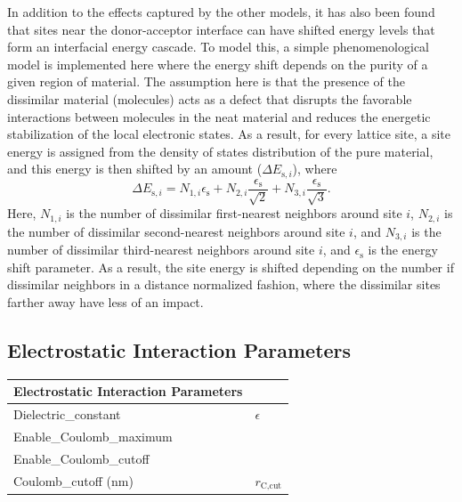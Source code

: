 \documentclass[%
 reprint,onecolumn,notitlepage,
superscriptaddress,longbibliography,
 amsmath,amssymb,
 aps,rmp,floatfix,
]{revtex4-1}
\begin{document}
In addition to the effects captured by the other models, it has also been found that sites near the donor-acceptor interface can have shifted energy levels that form an interfacial energy cascade.\cite{jamieson2012cs} 
To model this, a simple phenomenological model is implemented here where the energy shift depends on the purity of a given region of material. 
The assumption here is that the presence of the dissimilar material (molecules) acts as a defect that disrupts the favorable interactions between molecules in the neat material and reduces the energetic stabilization of the local electronic states. 
As a result, for every lattice site, a site energy is assigned from the density of states distribution of the pure material, and this energy is then shifted by an amount ($\Delta E_{\text{s},i}$), where
\begin{equation}
\Delta E_{\text{s},i} = N_{1,i} \epsilon_\text{s} + N_{2,i} \frac{\epsilon_\text{s}}{\sqrt{2}} + N_{3,i} \frac{\epsilon_\text{s}}{\sqrt{3}}.
\end{equation}
Here, $N_{1,i}$ is the number of dissimilar first-nearest neighbors around site $i$, $N_{2,i}$ is the number of dissimilar second-nearest neighbors around site $i$, and $N_{3,i}$ is the number of dissimilar third-nearest neighbors around site $i$, and $\epsilon_\text{s}$ is the energy shift parameter. 
As a result, the site energy is shifted depending on the number if dissimilar neighbors in a distance normalized fashion, where the dissimilar sites farther away have less of an impact. 

\subsection{Electrostatic Interaction Parameters}

\begin{center}
\begin{tabular}{ l l }
Electrostatic Interaction Parameters & \\
\hline
Dielectric\_constant & $\epsilon$ \\
Enable\_Coulomb\_maximum & \\
Enable\_Coulomb\_cutoff & \\
Coulomb\_cutoff (nm) & $r_{\text{C,cut}}$ \\
\end{tabular}
\end{center}
\end{document}
